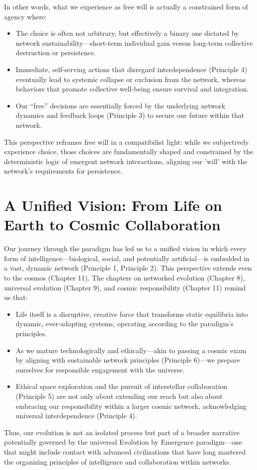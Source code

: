 \documentclass[12pt,openany]{book}
\begin{document}
In other words, what we experience as free will is actually a constrained form of agency where:
\begin{itemize}
    \item The choice is often not arbitrary, but effectively a binary one dictated by network sustainability—short-term individual gain versus long-term collective destruction or persistence.
    \item Immediate, self-serving actions that disregard interdependence (Principle 4) eventually lead to systemic collapse or exclusion from the network, whereas behaviors that promote collective well-being ensure survival and integration.
    \item Our “free” decisions are essentially forced by the underlying network dynamics and feedback loops (Principle 3) to secure our future within that network.
\end{itemize}
This perspective reframes free will in a compatibilist light: while we subjectively experience choice, those choices are fundamentally shaped and constrained by the deterministic logic of emergent network interactions, aligning our 'will' with the network's requirements for persistence. %

\section{A Unified Vision: From Life on Earth to Cosmic Collaboration}
Our journey through the paradigm has led us to a unified vision in which every form of intelligence—biological, social, and potentially artificial—is embedded in a vast, dynamic network (Principle 1, Principle 2). This perspective extends even to the cosmos (Chapter 11). The chapters on networked evolution (Chapter 8), universal evolution (Chapter 9), and cosmic responsibility (Chapter 11) remind us that:
\begin{itemize}
    \item Life itself is a disruptive, creative force that transforms static equilibria into dynamic, ever-adapting systems, operating according to the paradigm's principles.
    \item As we mature technologically and ethically—akin to passing a cosmic exam by aligning with sustainable network principles (Principle 6)—we prepare ourselves for responsible engagement with the universe.
    \item Ethical space exploration and the pursuit of interstellar collaboration (Principle 5) are not only about extending our reach but also about embracing our responsibility within a larger cosmic network, acknowledging universal interdependence (Principle 4).
\end{itemize}
Thus, our evolution is not an isolated process but part of a broader narrative potentially governed by the universal Evolution by Emergence paradigm—one that might include contact with advanced civilizations that have long mastered the organizing principles of intelligence and collaboration within networks. %
\end{document}
